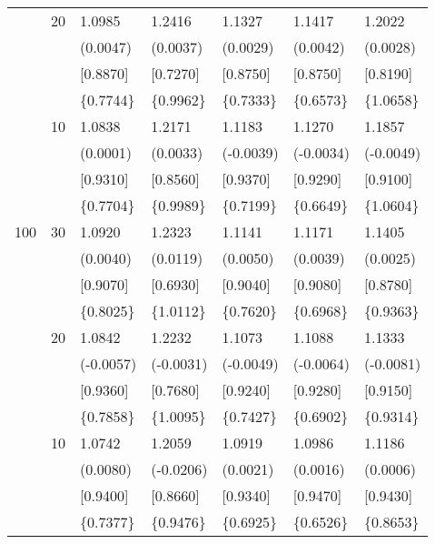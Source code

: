 \begin{table}[H]
{\begin{tabular}{c c | C{2.48cm} | C{2.48cm} | C{2.48cm} | C{2.48cm} | C{2.48cm} }
			&20&1.0985&1.2416&1.1327&1.1417&1.2022\\
			&&(0.0047)&(0.0037)&(0.0029)&(0.0042)&(0.0028)\\
			&&[0.8870]&[0.7270]&[0.8750]&[0.8750]&[0.8190]\\
			&&\{0.7744\}&\{0.9962\}&\{0.7333\}&\{0.6573\}&\{1.0658\}\\
			&10&1.0838&1.2171&1.1183&1.1270&1.1857\\
			&&(0.0001)&(0.0033)&(-0.0039)&(-0.0034)&(-0.0049)\\
			&&[0.9310]&[0.8560]&[0.9370]&[0.9290]&[0.9100]\\
			&&\{0.7704\}&\{0.9989\}&\{0.7199\}&\{0.6649\}&\{1.0604\}\\
			\cmidrule(lr){1-7}
			100&30&1.0920&1.2323&1.1141&1.1171&1.1405\\
			&&(0.0040)&(0.0119)&(0.0050)&(0.0039)&(0.0025)\\
			&&[0.9070]&[0.6930]&[0.9040]&[0.9080]&[0.8780]\\
			&&\{0.8025\}&\{1.0112\}&\{0.7620\}&\{0.6968\}&\{0.9363\}\\
			&20&1.0842&1.2232&1.1073&1.1088&1.1333\\
			&&(-0.0057)&(-0.0031)&(-0.0049)&(-0.0064)&(-0.0081)\\
			&&[0.9360]&[0.7680]&[0.9240]&[0.9280]&[0.9150]\\
			&&\{0.7858\}&\{1.0095\}&\{0.7427\}&\{0.6902\}&\{0.9314\}\\
			&10&1.0742&1.2059&1.0919&1.0986&1.1186\\
			&&(0.0080)&(-0.0206)&(0.0021)&(0.0016)&(0.0006)\\
			&&[0.9400]&[0.8660]&[0.9340]&[0.9470]&[0.9430]\\
			&&\{0.7377\}&\{0.9476\}&\{0.6925\}&\{0.6526\}&\{0.8653\}\\
			\bottomrule[1.5pt]
	\end{tabular}}
	\label{table:table S.2}
\end{table}

